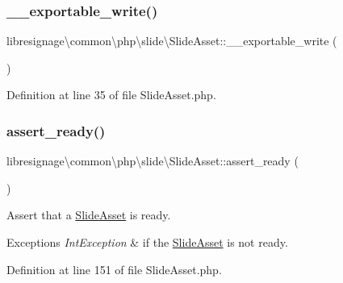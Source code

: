 \subsubsection{\texorpdfstring{\+\_\+\+\_\+exportable\+\_\+write()}{\_\_exportable\_write()}}
{\footnotesize\ttfamily libresignage\textbackslash{}common\textbackslash{}php\textbackslash{}slide\textbackslash{}\+Slide\+Asset\+::\+\_\+\+\_\+exportable\+\_\+write (\begin{DoxyParamCaption}{ }\end{DoxyParamCaption})}



Definition at line 35 of file Slide\+Asset.\+php.

\mbox{\label{classlibresignage_1_1common_1_1php_1_1slide_1_1SlideAsset_a0a4b66cbfb623dd2ed2afed1ae95a8a1}} 
\subsubsection{\texorpdfstring{assert\+\_\+ready()}{assert\_ready()}}
{\footnotesize\ttfamily libresignage\textbackslash{}common\textbackslash{}php\textbackslash{}slide\textbackslash{}\+Slide\+Asset\+::assert\+\_\+ready (\begin{DoxyParamCaption}{ }\end{DoxyParamCaption})\hspace{0.3cm}{\ttfamily [private]}}

Assert that a \hyperlink{classlibresignage_1_1common_1_1php_1_1slide_1_1SlideAsset}{Slide\+Asset} is ready.


\begin{DoxyExceptions}{Exceptions}
{\em Int\+Exception} & if the \hyperlink{classlibresignage_1_1common_1_1php_1_1slide_1_1SlideAsset}{Slide\+Asset} is not ready. \\
\hline
\end{DoxyExceptions}


Definition at line 151 of file Slide\+Asset.\+php.

\mbox{\label{classlibresignage_1_1common_1_1php_1_1slide_1_1SlideAsset_a021debf9bf225f4bf1fcb3329b4606e6}} 
